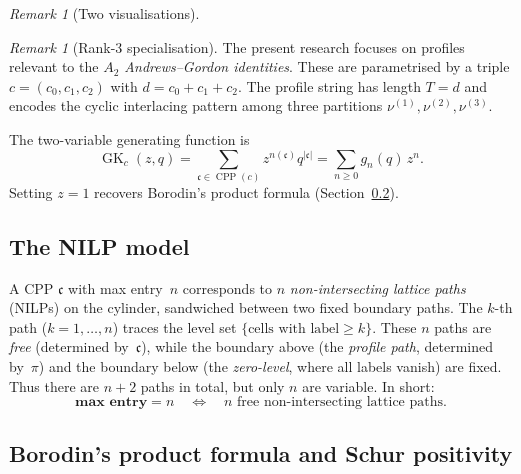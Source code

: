 \documentclass[11pt]{article}
\theoremstyle{plain}
\theoremstyle{definition}
\theoremstyle{remark}
\newtheorem{remark}[theorem]{Remark}
\newcommand{\CPP}{\operatorname{CPP}}
\newcommand{\GK}{\operatorname{GK}}
\begin{document}
\begin{remark}[Two visualisations]
\begin{enumerate}
\begin{center}
\end{center}

\end{enumerate}
\end{remark}

\begin{remark}[Rank-3 specialisation]\label{rem:rank3}
The present research focuses on profiles relevant to the
\emph{$A_2$ Andrews--Gordon identities}.  These are parametrised
by a triple $c = (c_0, c_1, c_2)$ with $d = c_0+c_1+c_2$.
The profile string has length $T = d$ and encodes the cyclic
interlacing pattern among three partitions
$\nu^{(1)}, \nu^{(2)}, \nu^{(3)}$.
\end{remark}

The two-variable generating function is
\begin{equation}\label{eq:GK}
  \GK_c(z,q) = \sum_{\mathfrak{c} \in \CPP(c)} z^{n(\mathfrak{c})} q^{|\mathfrak{c}|}
  = \sum_{n \geq 0} g_n(q)\, z^n.
\end{equation}
Setting $z = 1$ recovers Borodin's product formula
(Section~\ref{sec:borodin}).

\subsection{The NILP model}
\label{sec:nilp}

A CPP $\mathfrak{c}$ with max entry~$n$ corresponds to
$n$ \emph{non-intersecting lattice paths} (NILPs) on the cylinder,
sandwiched between two fixed boundary paths.
The $k$-th path ($k = 1, \ldots, n$) traces the level set
$\{\text{cells with label} \geq k\}$. These $n$ paths are
\emph{free} (determined by~$\mathfrak{c}$), while the boundary
above (the \emph{profile path}, determined by~$\pi$) and the
boundary below (the \emph{zero-level}, where all labels vanish)
are fixed.  Thus there are $n + 2$ paths in total, but only
$n$ are variable.  In short:
\[
  \textbf{max entry} = n
  \quad\Longleftrightarrow\quad
  n \text{ free non-intersecting lattice paths.}
\]


\subsection{Borodin's product formula and Schur positivity}
\label{sec:borodin}
\end{document}
